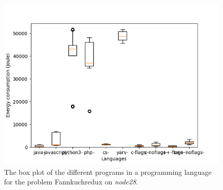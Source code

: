 \begin{appendices}
\begin{figure}[h]
    \centering
    \includegraphics[width=.6\textwidth]{graphs/fannkuchredux_BOXoverview3.png}
    \caption{The box plot of the different programs in a programming language for the problem Fannkuchredux on \textit{node28}.}
    \label{fig:box-fannkuchredux3}
\end{figure}

\begin{table}[h]
\centering
{}
\caption{The comparison of the different languages for the Fannkuchredux problem on \textit{node28}. A \textit{+} means that the language on the row has a lower energy consumption then the language on the column, the opposite for \textit{-}.}
\label{tab:lang-fannkuchredux3}
\end{table}


\end{appendices}
